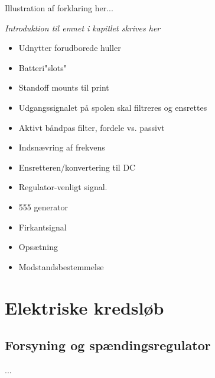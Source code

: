 Illustration af forklaring her...

\emph{Introduktion til emnet i kapitlet skrives her}
\begin {itemize}
\item Udnytter forudborede huller
\item Batteri"slots"
\item Standoff mounts til print

\item Udgangssignalet på spolen skal filtreres og ensrettes
\item Aktivt båndpas filter, fordele vs. passivt
\item Indsnævring af frekvens
\item Ensretteren/konvertering til DC
\item Regulator-venligt signal. 

\item 555 generator
\item Firkantsignal
\item Opsætning 
\item Modstandsbestemmelse
\end {itemize}

\section{Elektriske kredsløb}\label{sec:sec_sparningsreg}
\subsection{Forsyning og spændingsregulator}
...
